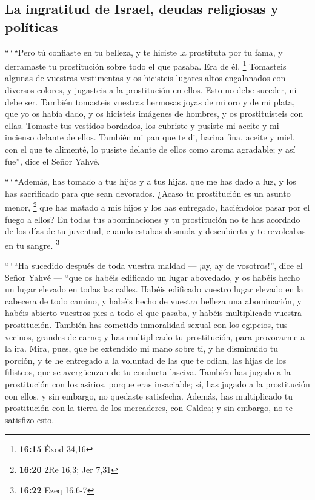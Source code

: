 \hypertarget{la-ingratitud-de-israel-deudas-religiosas-y-poluxedticas}{%
\subsection{La ingratitud de Israel, deudas religiosas y
políticas}\label{la-ingratitud-de-israel-deudas-religiosas-y-poluxedticas}}

 ``\,`\,``Pero tú confiaste en tu belleza, y te hiciste
la prostituta por tu fama, y derramaste tu prostitución sobre todo el
que pasaba. Era de él. \footnote{\textbf{16:15} Éxod 34,16}
 Tomasteis algunas de vuestras vestimentas y os hicisteis
lugares altos engalanados con diversos colores, y jugasteis a la
prostitución en ellos. Esto no debe suceder, ni debe ser.
 También tomasteis vuestras hermosas joyas de mi oro y de
mi plata, que yo os había dado, y os hicisteis imágenes de hombres, y os
prostituisteis con ellas.  Tomaste tus vestidos bordados,
los cubriste y pusiste mi aceite y mi incienso delante de ellos.
 También mi pan que te di, harina fina, aceite y miel,
con el que te alimenté, lo pusiste delante de ellos como aroma
agradable; y así fue'', dice el Señor Yahvé.

 ``\,`\,``Además, has tomado a tus hijos y a tus hijas,
que me has dado a luz, y los has sacrificado para que sean devorados.
¿Acaso tu prostitución es un asunto menor, \footnote{\textbf{16:20} 2Re
  16,3; Jer 7,31}  que has matado a mis hijos y los has
entregado, haciéndolos pasar por el fuego a ellos?  En
todas tus abominaciones y tu prostitución no te has acordado de los días
de tu juventud, cuando estabas desnuda y descubierta y te revolcabas en
tu sangre. \footnote{\textbf{16:22} Ezeq 16,6-7}

 ``\,`\,``Ha sucedido después de toda vuestra maldad ---
¡ay, ay de vosotros!'', dice el Señor Yahvé ---  ``que os
habéis edificado un lugar abovedado, y os habéis hecho un lugar elevado
en todas las calles.  Habéis edificado vuestro lugar
elevado en la cabecera de todo camino, y habéis hecho de vuestra belleza
una abominación, y habéis abierto vuestros pies a todo el que pasaba, y
habéis multiplicado vuestra prostitución.  También has
cometido inmoralidad sexual con los egipcios, tus vecinos, grandes de
carne; y has multiplicado tu prostitución, para provocarme a la ira.
 Mira, pues, que he extendido mi mano sobre ti, y he
disminuido tu porción, y te he entregado a la voluntad de las que te
odian, las hijas de los filisteos, que se avergüenzan de tu conducta
lasciva.  También has jugado a la prostitución con los
asirios, porque eras insaciable; sí, has jugado a la prostitución con
ellos, y sin embargo, no quedaste satisfecha.  Además,
has multiplicado tu prostitución con la tierra de los mercaderes, con
Caldea; y sin embargo, no te satisfizo esto.


